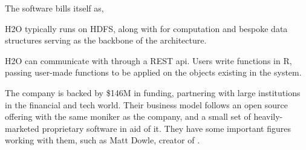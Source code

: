 The  software bills itself as,


H2O typically runs on HDFS, along with  for computation and bespoke
data structures serving as the backbone of the architecture.

H2O can communicate with \R{} through a REST api. Users write functions in
R, passing user-made functions to be applied on the objects existing in
the  system\cite{h2o.ai:_h2o}.

The company  is backed by \$146M in funding, partnering with large
institutions in the financial and tech world. Their business model
follows an open source offering with the same moniker as the company,
and a small set of heavily-marketed proprietary software in aid of it.
They have some important figures working with them, such as Matt Dowle,
creator of .
